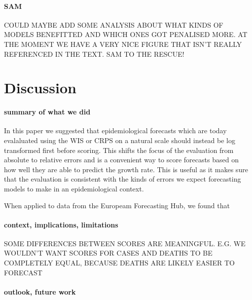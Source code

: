 \documentclass{article}
\begin{document}
\paragraph{SAM} 

COULD MAYBE ADD SOME ANALYSIS ABOUT WHAT KINDS OF MODELS BENEFITTED AND WHICH ONES GOT PENALISED MORE. AT THE MOMENT WE HAVE A VERY NICE FIGURE THAT ISN'T REALLY REFERENCED IN THE TEXT. SAM TO THE RESCUE!





\section{Discussion}

\paragraph{summary of what we did}
In this paper we suggested that epidemiological forecasts which are today evalaluated using the WIS or CRPS on a natural scale should instead be log transformed first before scoring. This shifts the focus of the evaluation from absolute to relative errors and is a convenient way to score forecasts based on how well they are able to predict the growth rate. This is useful as it makes sure that the evaluation is consistent with the kinds of errors we expect forecasting models to make in an epidemiological context. 

When applied to data from the Europeam Forecasting Hub, we found that 

\paragraph{context, implications, limitations}

SOME DIFFERENCES BETWEEN SCORES ARE MEANINGFUL. E.G. WE WOULDN'T WANT SCORES FOR CASES AND DEATHS TO BE COMPLETELY EQUAL, BECAUSE DEATHS ARE LIKELY EASIER TO FORECAST

\paragraph{outlook, future work}
\end{document}

